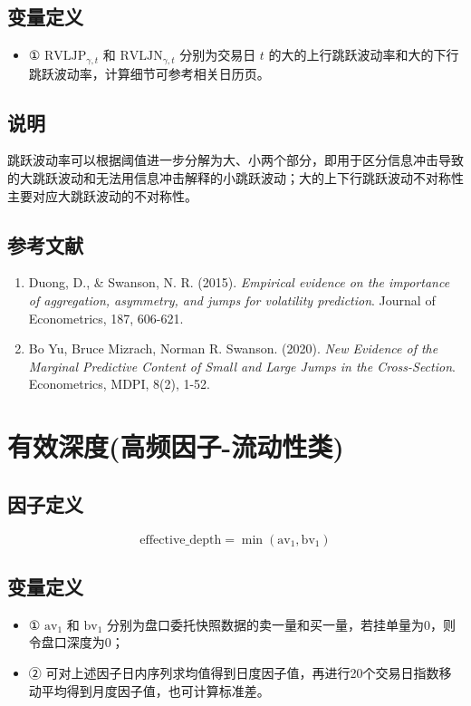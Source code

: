 \documentclass{article}
\begin{document}
\subsection{变量定义}
\begin{itemize}
    \item ① \( \mathrm{RVLJP}_{\gamma,t} \) 和 \( \mathrm{RVLJN}_{\gamma,t} \) 分别为交易日 \( t \) 的大的上行跳跃波动率和大的下行跳跃波动率，计算细节可参考相关日历页。
\end{itemize}

\subsection{说明}
跳跃波动率可以根据阈值进一步分解为大、小两个部分，即用于区分信息冲击导致的大跳跃波动和无法用信息冲击解释的小跳跃波动；大的上下行跳跃波动不对称性主要对应大跳跃波动的不对称性。

\subsection{参考文献}
\begin{enumerate}
    \item Duong, D., \& Swanson, N. R. (2015). \textit{Empirical evidence on the importance of aggregation, asymmetry, and jumps for volatility prediction}. Journal of Econometrics, 187, 606-621.
    \item Bo Yu, Bruce Mizrach, Norman R. Swanson. (2020). \textit{New Evidence of the Marginal Predictive Content of Small and Large Jumps in the Cross-Section}. Econometrics, MDPI, 8(2), 1-52.
\end{enumerate}

\section{有效深度(高频因子-流动性类)}

\subsection{因子定义}
\begin{equation}
    \mathrm{effective\_depth} = \min(\mathrm{av}_1, \mathrm{bv}_1)
\end{equation}

\subsection{变量定义}
\begin{itemize}
    \item ① \( \mathrm{av}_1 \) 和 \( \mathrm{bv}_1 \) 分别为盘口委托快照数据的卖一量和买一量，若挂单量为0，则令盘口深度为0；
    \item ② 可对上述因子日内序列求均值得到日度因子值，再进行20个交易日指数移动平均得到月度因子值，也可计算标准差。
\end{itemize}
\end{document}
